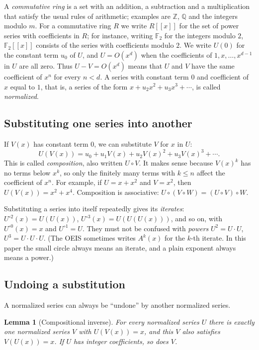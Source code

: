 \documentclass[11pt,a4paper]{article}
\newtheorem{lemma}[theorem]{Lemma}
\theoremstyle{definition}
\theoremstyle{remark}
\newcommand{\Z}{\mathbb{Z}}
\newcommand{\Q}{\mathbb{Q}}
\newcommand{\F}{\mathbb{F}}
\newcommand{\ps}[1]{#1[[x]]}
\begin{document}
A \emph{commutative ring} is a set with an addition, a subtraction and a multiplication that satisfy the usual rules
of arithmetic; examples are $\Z$, $\Q$ and the integers modulo $m$. For a commutative ring $R$ we write $\ps{R}$ for
the set of power series with coefficients in $R$; for instance, writing $\F_2$ for the integers modulo $2$, $\ps{\F_2}$
consists of the series with coefficients modulo $2$. We write
$U(0)$ for the constant term $u_0$ of $U$, and $U=O(x^d)$ when the coefficients of $1,x,\dots,x^{d-1}$ in $U$ are all
zero. Thus $U-V=O(x^d)$ means that $U$ and $V$ have the same coefficient of $x^n$ for every $n<d$. A series with
constant term $0$ and coefficient of $x$ equal to $1$, that is, a series of the form $x+u_2x^2+u_3x^3+\cdots$, is
called \emph{normalized}.

\subsection{Substituting one series into another}
If $V(x)$ has constant term $0$, we can substitute $V$ for $x$ in $U$:
\[
U(V(x))=u_0+u_1V(x)+u_2V(x)^2+u_3V(x)^3+\cdots .
\]
This is called \emph{composition}, also written $U\circ V$. It makes sense because $V(x)^k$ has no terms below $x^k$,
so only the finitely many terms with $k\le n$ affect the coefficient of $x^n$. For example, if $U=x+x^2$ and $V=x^2$, then
$U(V(x))=x^2+x^4$. Composition is associative: $U\circ(V\circ W)=(U\circ V)\circ W$.

Substituting a series into itself repeatedly gives its \emph{iterates}: $U^{\circ2}(x)=U(U(x))$,
$U^{\circ3}(x)=U(U(U(x)))$, and so on, with $U^{\circ0}(x)=x$ and $U^{\circ1}=U$. They must not be confused with
\emph{powers} $U^2=U\cdot U$, $U^3=U\cdot U\cdot U$. (The OEIS sometimes writes $A^k(x)$ for the $k$-th iterate. In
this paper the small circle always means an iterate, and a plain exponent always means a power.)

\subsection{Undoing a substitution}
A normalized series can always be ``undone'' by another normalized series.

\begin{lemma}[Compositional inverse]\label{lem:inverse}
For every normalized series $U$ there is exactly one normalized series $V$ with $U(V(x))=x$, and this $V$ also
satisfies $V(U(x))=x$. If $U$ has integer coefficients, so does $V$.
\end{lemma}
\end{document}
